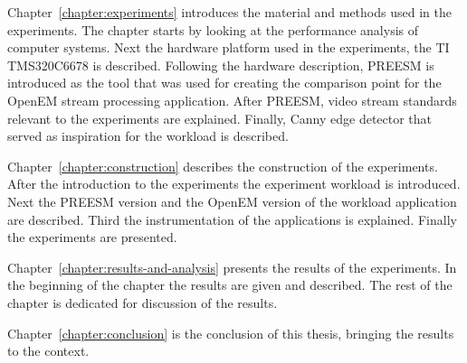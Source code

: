 Chapter~\ref{chapter:experiments} introduces the material and methods used in the experiments. The chapter starts by looking at the performance analysis of computer systems. Next the hardware platform used in the experiments, the TI TMS320C6678 is described. Following the hardware description, PREESM is introduced as the tool that was used for creating the comparison point for the OpenEM stream processing application. After PREESM, video stream standards relevant to the experiments are explained. Finally, Canny edge detector that served as inspiration for the workload is described.

Chapter~\ref{chapter:construction} describes the construction of the experiments. After the introduction to the experiments the experiment workload is introduced. Next the PREESM version and the OpenEM version of the workload application are described. Third the instrumentation of the applications is explained. Finally the experiments are presented.

Chapter~\ref{chapter:results-and-analysis} presents the results of the experiments. In the beginning of the chapter the results are given and described. The rest of the chapter is dedicated for discussion of the results.

Chapter~\ref{chapter:conclusion} is the conclusion of this thesis, bringing the results to the context.
